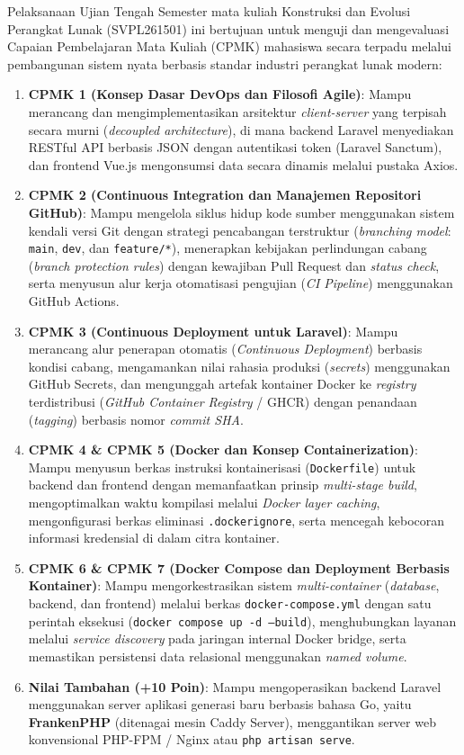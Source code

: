 \documentclass[a4paper,oneside,11pt]{book}
\begin{document}
Pelaksanaan Ujian Tengah Semester mata kuliah Konstruksi dan Evolusi Perangkat Lunak (SVPL261501) ini bertujuan untuk menguji dan mengevaluasi Capaian Pembelajaran Mata Kuliah (CPMK) mahasiswa secara terpadu melalui pembangunan sistem nyata berbasis standar industri perangkat lunak modern:
\begin{enumerate}
\item \textbf{CPMK 1 (Konsep Dasar DevOps dan Filosofi Agile)}: Mampu merancang dan mengimplementasikan arsitektur \textit{client-server} yang terpisah secara murni (\textit{decoupled architecture}), di mana backend Laravel menyediakan RESTful API berbasis JSON dengan autentikasi token (Laravel Sanctum), dan frontend Vue.js mengonsumsi data secara dinamis melalui pustaka Axios.
\item \textbf{CPMK 2 (Continuous Integration dan Manajemen Repositori GitHub)}: Mampu mengelola siklus hidup kode sumber menggunakan sistem kendali versi Git dengan strategi pencabangan terstruktur (\textit{branching model}: \texttt{main}, \texttt{dev}, dan \texttt{feature/*}), menerapkan kebijakan perlindungan cabang (\textit{branch protection rules}) dengan kewajiban Pull Request dan \textit{status check}, serta menyusun alur kerja otomatisasi pengujian (\textit{CI Pipeline}) menggunakan GitHub Actions.
\item \textbf{CPMK 3 (Continuous Deployment untuk Laravel)}: Mampu merancang alur penerapan otomatis (\textit{Continuous Deployment}) berbasis kondisi cabang, mengamankan nilai rahasia produksi (\textit{secrets}) menggunakan GitHub Secrets, dan mengunggah artefak kontainer Docker ke \textit{registry} terdistribusi (\textit{GitHub Container Registry} / GHCR) dengan penandaan (\textit{tagging}) berbasis nomor \textit{commit SHA}.
\item \textbf{CPMK 4 \& CPMK 5 (Docker dan Konsep Containerization)}: Mampu menyusun berkas instruksi kontainerisasi (\texttt{Dockerfile}) untuk backend dan frontend dengan memanfaatkan prinsip \textit{multi-stage build}, mengoptimalkan waktu kompilasi melalui \textit{Docker layer caching}, mengonfigurasi berkas eliminasi \texttt{.dockerignore}, serta mencegah kebocoran informasi kredensial di dalam citra kontainer.
\item \textbf{CPMK 6 \& CPMK 7 (Docker Compose dan Deployment Berbasis Kontainer)}: Mampu mengorkestrasikan sistem \textit{multi-container} (\textit{database}, backend, dan frontend) melalui berkas \texttt{docker-compose.yml} dengan satu perintah eksekusi (\texttt{docker compose up -d --build}), menghubungkan layanan melalui \textit{service discovery} pada jaringan internal Docker bridge, serta memastikan persistensi data relasional menggunakan \textit{named volume}.
\item \textbf{Nilai Tambahan (+10 Poin)}: Mampu mengoperasikan backend Laravel menggunakan server aplikasi generasi baru berbasis bahasa Go, yaitu \textbf{FrankenPHP} (ditenagai mesin Caddy Server), menggantikan server web konvensional PHP-FPM / Nginx atau \texttt{php artisan serve}.
\end{enumerate}
\end{document}
